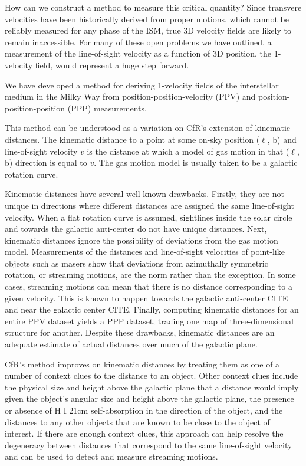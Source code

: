 How can we construct a method to measure this critical quantity? Since transvere velocities have been historically derived from proper motions, which cannot be reliably measured for any phase of the ISM, true 3D velocity fields are likely to remain inaccessible. 
For many of these open problems we have outlined, a measurement of the line-of-sight velocity as a function of 3D position, the 1-velocity field, would represent a huge step forward.



We have developed a method for deriving 1-velocity fields of the interstellar medium in the Milky Way from position-position-velocity (PPV) and position-position-position (PPP) measurements. 

This method can be understood as a variation on CfR's extension of kinematic distances.
The kinematic distance to a point at some on-sky position ($\ell$, b) and line-of-sight velocity $v$ is the distance at which a model of gas motion in that ($\ell$, b) direction is equal to $v$.
The gas motion model is usually taken to be a galactic rotation curve. 

Kinematic distances have several well-known drawbacks.
Firstly, they are not unique in directions where different distances are assigned the same line-of-sight velocity.
When a flat rotation curve is assumed, sightlines inside the solar circle and towards the galactic anti-center do not have unique distances. 
Next, kinematic distances ignore the possibility of deviations from the gas motion model.
Measurements of the distances and line-of-sight velocities of point-like objects such as masers show that deviations from azimuthally symmetric rotation, or streaming motions, are the norm rather than the exception.
In some cases, streaming motions can mean that there is no distance corresponding to a given velocity. 
This is known to happen towards the galactic anti-center CITE and near the galactic center CITE.
Finally, computing kinematic distances for an entire PPV dataset yields a PPP dataset, trading one map of three-dimensional structure for another.
Despite these drawbacks, kinematic distances are an adequate estimate of actual distances over much of the galactic plane.

CfR's method improves on kinematic distances by treating them as one of a number of context clues to the distance to an object.
Other context clues include the physical size and height above the galactic plane that a distance would imply given the object's angular size and height above the galactic plane, the presence or absence of H I 21cm self-absorption in the direction of the object, and the distances to any other objects that are known to be close to the object of interest.
If there are enough context clues, this approach can help resolve the degeneracy between distances that correspond to the same line-of-sight velocity and can be used to detect and measure streaming motions.

